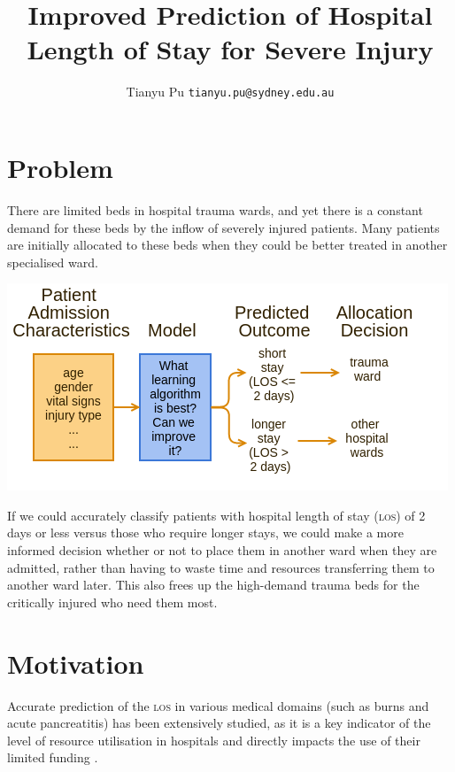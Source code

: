 \documentclass[portrait]{usydposter}
\title{Improved Prediction of Hospital Length of Stay for Severe Injury}
\author{Tianyu Pu \xspace \texttt{tianyu.pu@sydney.edu.au}}
\newcommand{\acronym}[1]{\textsc{#1}\xspace}
\newcommand{\los}{\acronym{los}}
\begin{document}
\makeheader

\begin{multicols}{3}

\section{Problem}
\noindent There are limited beds in hospital trauma wards, and yet there is a
constant demand for these beds by the inflow of severely injured patients. Many
patients are initially allocated to these beds when they could be better
treated in another specialised ward.
\begin{center}
\includegraphics{problem-diag}
\end{center}

\noindent If we could accurately classify patients with hospital length of
stay (\los) of 2 days or less versus those who require longer stays, we could
make a more informed decision whether or not to place them in another ward
when they are admitted, rather than having to waste time and resources
transferring them to another ward later. This also frees up the high-demand
trauma beds for the critically injured who need them most.
\\

\section{Motivation}
\noindent Accurate prediction of the \los in various medical
domains (such as burns and acute pancreatitis) has been extensively studied,
as it is a key indicator of the level of
resource utilisation in hospitals and directly impacts the use of their limited
funding \cite{Walczak2003}.
\\


\end{multicols}
\end{document}
